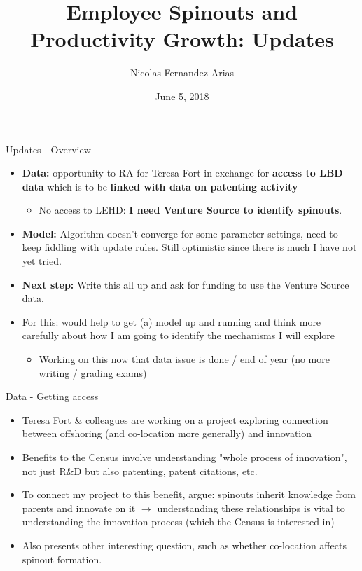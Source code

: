 \documentclass[english,usenames,dvipsnames]{beamer}
\title{Employee Spinouts and Productivity Growth: Updates}
\author{Nicolas Fernandez-Arias}
\date[June 5, 2018]{June 5, 2018}
\begin{document}
	  
\frame{\titlepage}

\begin{frame}{Updates - Overview}
\begin{itemize}
	\item \textbf{Data:} opportunity to RA for Teresa Fort in exchange for \textbf{access to LBD data} which is to be \textbf{linked with data on patenting activity}
	\begin{itemize}
		\item No access to LEHD: \textbf{I need Venture Source to identify spinouts}. 
	\end{itemize}
	\item \textbf{Model:} Algorithm doesn't converge for some parameter settings, need to keep fiddling with update rules. Still optimistic since there is much I have not yet tried. 
	\item \textbf{Next step:} Write this all up and ask for funding to use the Venture Source data. 
	\item For this: would help to get (a) model up and running and think more carefully about how I am going to identify the mechanisms I will explore
	\begin{itemize}
		\item Working on this now that data issue is done / end of year (no more writing / grading exams)
	\end{itemize}
\end{itemize}
\end{frame}

\begin{frame}{Data - Getting access}
\begin{itemize}
	\item Teresa Fort \& colleagues are working on a project exploring connection between offshoring (and co-location more generally) and innovation
	\item Benefits to the Census involve understanding "whole process of innovation", not just R\&D but also patenting, patent citations, etc.
	\item To connect my project to this benefit, argue: spinouts inherit knowledge from parents and innovate on it $\rightarrow$ understanding these relationships is vital to understanding the innovation process (which the Census is interested in)
	\item Also presents other interesting question, such as whether co-location affects spinout formation. 
\end{itemize}
\end{frame}
\end{document}
